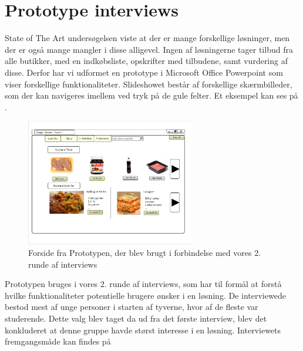 \section{Prototype interviews}\label{section:interview2}
State of The Art undersøgelsen viste at der er mange forskellige løsninger, men der er også mange mangler i disse alligevel.
Ingen af løsningerne tager tilbud fra alle butikker, med en indkøbsliste, opskrifter med tilbudene, samt vurdering af disse.
Derfor har vi udformet en prototype i Microsoft Office Powerpoint som viser forskellige funktionaliteter.
Slideshowet består af forskellige skærmbilleder, som der kan navigeres imellem ved tryk på de gule felter.
Et eksempel kan ses på .

\begin{figure}
\vspace{-20pt}
	\begin{center}
		\includegraphics[width=0.66\textwidth]{images/Images/prototype-forside.PNG}
	\end{center}
	\vspace{-20pt}
	\caption{Forside fra Prototypen, der blev brugt i forbindelse med vores 2. runde af interviews}\label{ss:Prototype}
	\vspace{-20pt}
\end{figure}

Prototypen bruges i vores 2. runde af interviews, som har til formål at forstå hvilke funktionaliteter potentielle brugere ønsker i en løsning.
De interviewede bestod mest af unge personer i starten af tyverne, hvor af de fleste var studerende.
Dette valg blev taget da ud fra det første interview, blev det konkluderet at denne gruppe havde størst interesse i en løsning.
Interviewets fremgangsmåde kan findes på 


